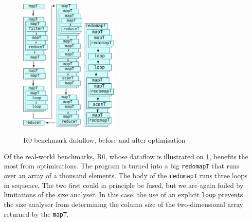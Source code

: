 \begin{figure}
\begin{center}
\includegraphics[width=3.2cm]{img/PricingLexiFi-unfused.pdf}
\hspace{1cm}
\includegraphics[width=1.6cm]{img/PricingLexiFi-fused.pdf}
\end{center}
\caption{R0 benchmark dataflow, before and after optimisation}
\label{fig:r0-dataflow}
\end{figure}

Of the real-world benchmarks, R0, whose dataflow is illustrated on
\cref{fig:r0-dataflow}, benefits the most from optimisations.  The
program is turned into a big \texttt{redomapT} that runs over an array
of a thousand elements.  The body of the \texttt{redomapT} runs three
loops in sequence.  The two first could in principle be fused, but we
are again foiled by limitations of the size analyser.  In this case,
the use of an explicit \texttt{loop} prevents the size analyser from
determining the column size of the two-dimensional array returned by
the \texttt{mapT}.

